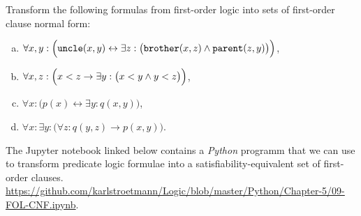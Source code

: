 \exerciseEng
Transform the following formulas from first-order logic into sets of first-order clause normal form:
\begin{enumerate}[(a)]
\item $\forall x, y: \Bigl(\mathtt{uncle}(x,y) \leftrightarrow
       \exists z: \bigl(\mathtt{brother}(x,z) \wedge \mathtt{parent}(z,y)\bigr)\Bigr)$,
\item $\forall x, z: \Bigl(x < z \rightarrow \exists y: \bigl(x < y \wedge y < z\bigr)\Bigr)$,
\item $\forall x: \bigl(p(x) \leftrightarrow \exists y: q(x,y) \bigr)$, 
\item $\forall x: \exists y: \bigl(\forall z:q(y,z) \rightarrow p(x,y)\bigr)$. \eox
\end{enumerate}%
\vspace*{-0.1cm}

\noindent
The Jupyter notebook linked below contains a \textsl{Python} programm that we can use to transform predicate
logic formulae into a satisfiability-equivalent set of first-order clauses. 
\\[0.2cm]
\hspace*{0.3cm}
\href{https://github.com/karlstroetmann/Logic/blob/master/Python/Chapter-5/09-FOL-CNF.ipynb}{https://github.com/karlstroetmann/Logic/blob/master/Python/Chapter-5/09-FOL-CNF.ipynb}.
\vspace*{0.2cm}

